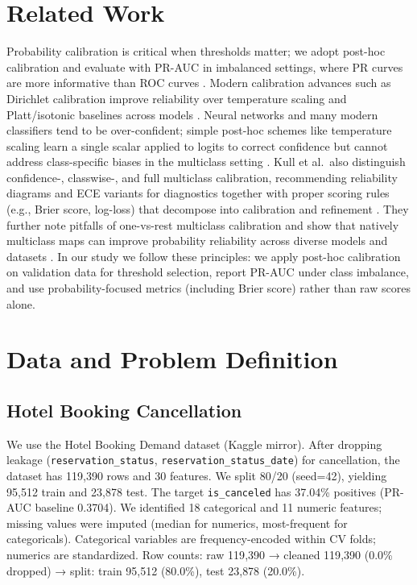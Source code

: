 \documentclass[conference]{IEEEtran}
\newcommand{\datasetA}{Hotel Booking Cancellation}
\newcommand{\seed}{42}
\begin{document}
\section{Related Work}
Probability calibration is critical when thresholds matter; we adopt post-hoc calibration and evaluate with PR-AUC in imbalanced settings, where PR curves are more informative than ROC curves \cite{Saito2015PRvsROC}. Modern calibration advances such as Dirichlet calibration improve reliability over temperature scaling and Platt/isotonic baselines across models \cite{Kull2019DirichletCal}.
Neural networks and many modern classifiers tend to be over-confident; simple post-hoc schemes like temperature scaling learn a single scalar applied to logits to correct confidence but cannot address class-specific biases in the multiclass setting \cite{Kull2019DirichletCal}. Kull et al.\ also distinguish confidence-, classwise-, and full multiclass calibration, recommending reliability diagrams and ECE variants for diagnostics together with proper scoring rules (e.g., Brier score, log-loss) that decompose into calibration and refinement \cite{Kull2019DirichletCal}. They further note pitfalls of one-vs-rest multiclass calibration and show that natively multiclass maps can improve probability reliability across diverse models and datasets \cite{Kull2019DirichletCal}. In our study we follow these principles: we apply post-hoc calibration on validation data for threshold selection, report PR-AUC under class imbalance, and use probability-focused metrics (including Brier score) rather than raw scores alone.

\section{Data and Problem Definition}
\subsection{\datasetA}
We use the Hotel Booking Demand dataset \cite{Antonio2019Hotel} (Kaggle mirror). After dropping leakage (\texttt{reservation\_status}, \texttt{reservation\_status\_date}) for cancellation, the dataset has 119{,}390 rows and 30 features. We split 80/20 (seed=\seed), yielding 95{,}512 train and 23{,}878 test. The target \texttt{is\_canceled} has 37.04\% positives (PR-AUC baseline 0.3704). We identified 18 categorical and 11 numeric features; missing values were imputed (median for numerics, most-frequent for categoricals). Categorical variables are frequency-encoded within CV folds; numerics are standardized.
Row counts: raw 119{,}390 → cleaned 119{,}390 (0.0\% dropped) → split: train 95{,}512 (80.0\%), test 23{,}878 (20.0\%).
\end{document}
